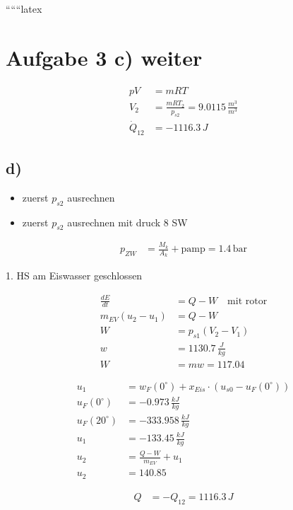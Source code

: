 ``````latex


\section*{Aufgabe 3 c) weiter}

\begin{align*}
pV &= mRT \\
V_2 &= \frac{m R T_2}{p_{s2}} = 9.0115 \, \frac{m^3}{m^3} \\
\dot{Q}_{12} &= -1116.3 \, J
\end{align*}

\subsection*{d)}

\begin{itemize}
    \item zuerst $p_{s2}$ ausrechnen
    \item zuerst $p_{s2}$ ausrechnen mit druck 8 SW
\end{itemize}

\begin{align*}
p_{ZW} &= \frac{M_{k}}{A_{k}} + \text{pamp} = 1.4 \, \text{bar}
\end{align*}

1. HS am Eiswasser geschlossen

\begin{align*}
\frac{dE}{dt} &= Q - W \quad \text{mit rotor} \\
m_{EV}(u_2 - u_1) &= Q - W \\
W &= p_{s1}(V_2 - V_1) \\
w &= 1130.7 \, \frac{J}{kg} \\
W &= m w = 117.04
\end{align*}

\begin{align*}
u_1 &= w_{F}(0^\circ) + x_{Eis} \cdot (u_{s0} - u_{F}(0^\circ)) \\
u_{F}(0^\circ) &= -0.973 \, \frac{kJ}{kg} \\
u_{F}(20^\circ) &= -333.958 \, \frac{kJ}{kg} \\
u_1 &= -133.45 \, \frac{kJ}{kg} \\
u_2 &= \frac{Q - W}{m_{EV}} + u_1 \\
u_2 &= 140.85
\end{align*}

\begin{align*}
Q &= -Q_{12} = 1116.3 \, J
\end{align*}

